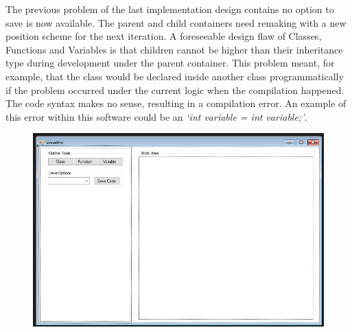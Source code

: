 \documentclass[12pt]{report} %
\begin{document}
			The previous problem of the last implementation design contains no option to save is now available. The parent and child containers need remaking with a new position scheme for the next iteration. A foreseeable design flaw of Classes, Functions and Variables is that children cannot be higher than their inheritance type during development under the parent container. This problem meant, for example, that the class would be declared inside another class programmatically if the problem occurred under the current logic when the compilation happened. The code syntax makes no sense, resulting in a compilation error. An example of this error within this software could be an \textit{`int variable = int variable;'}. 
			\begin{figure}[H]
				{\includegraphics[scale=0.45]{Figures/vp-designs/NET_Framework-GUI-4.jpg}}
			\end{figure}
\end{document}
